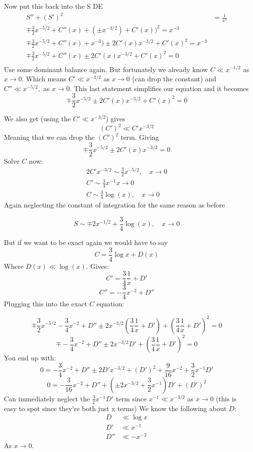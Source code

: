 \documentclass{/home/janmebows/Documents/LatexTemplates/myassignment}
\begin{document}
Now put this back into the S DE
\begin{align*}
S'' + (S')^2 &= \frac1{x^3}\\
\mp \frac32 x^{-5/2} + C''(x) + (\pm x^{-3/2}) + C'(x))^2 = x^{-3}\\
\mp \frac32 x^{-5/2} + C''(x) + x^{-3}) \pm 2 C'(x)x^{-3/2} + C'(x)^2 = x^{-3}\\
\mp \frac32 x^{-5/2} + C''(x) \pm 2 C'(x)x^{-3/2} + C'(x)^2 = 0\\
\end{align*}
Use some dominant balance again. But fortunately we already know $C \ll x^{-1/2}$ as $x\to0$.
Which means $C' \ll x^{-3/2}$ as $x\to0$ (can drop the constant) and $C'' \ll x^{-5/2},$ as $x\to 0$.
This last statement simplifies our equation and it becomes
\[\mp \frac32 x^{-5/2} \pm 2 C'(x)x^{-3/2} + C'(x)^2 = 0\]

We also get (using the $C'\ll x^{-3/2}$) gives
\[(C')^2 \ll C' x^{-3/2}\]
Meaning that we can drop the $(C')^2$ term. Giving
\[\mp \frac32 x^{-5/2} \pm 2 C'(x)x^{-3/2} = 0\]
Solve $C$ now:
\begin{align*}
	2C' x^{-3/2} \sim \frac32 x^{-5/2}, \quad x\to 0\\
	C' \sim \frac34 x^{-1} x\to 0\\
	C \sim \frac34 \log(x), \quad x\to 0
\end{align*}
Again neglecting the constant of integration for the same reason as before

\[S\sim \mp 2x^{-1/2} + \frac34 \log(x), \quad x\to 0\]

But if we want to be exact again we would have to say
\[C = \frac34 \log x + D(x)\]
Where $D(x) \ll \log(x)$.
Gives:
\[C' = \frac34 \frac1x + D'\]
\[C''= -\frac34 x^{-2} + D''\]
Plugging this into the exact $C$ equation:

\[\mp \frac32 x^{-5/2}  -\frac34 x^{-2} + D'' \pm 2x^{-3/2} (\frac34 \frac1x + D') + (\frac34 \frac1x + D')^2 = 0\]
\[\mp  -\frac34 x^{-2} + D'' \pm 2x^{-3/2} D' + (\frac34 \frac1x + D')^2 = 0\]
You end up with:
\[0 = - \frac34 x^{-2} + D'' \pm 2D 'x^{-3/2} + (D')^2 + \frac{9}{16} x^{-2} + \frac32 x^{-1}D' \]
\[0= -\frac3{16} x^{-2} + D'' + (\pm2x ^{-3/2} + \frac32 x^{-1})D' + (D')^2\]
Can immediately neglect the $\frac32 x^{-1} D'$ term since $x^{-1} \ll x^{-3/2}$ as $x\to 0$ (this is easy to spot since they're both just x terms)
We know the following about $D$:
\begin{align*}
    D &\ll \log x\\
    D' &\ll x^{-1}\\
    D'' &\ll -x^{-2}
\end{align*}
As $x\to 0$.
\end{document}
